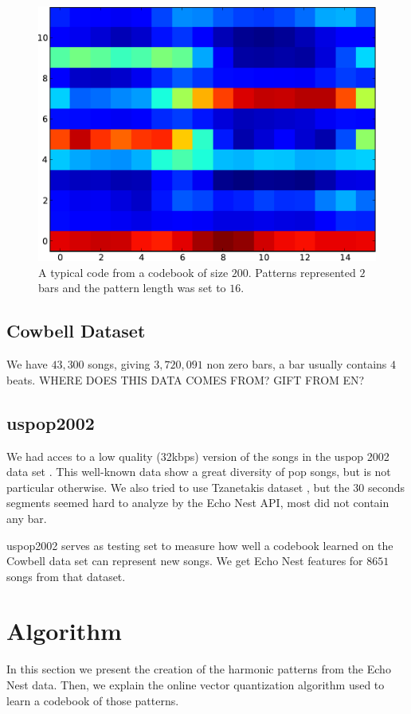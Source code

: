 \documentclass{article}
\begin{document}
\begin{figure}[htb]
\begin{center}
\includegraphics[width=.8\columnwidth]{code}
\end{center}
\caption{{A typical code from a codebook of size $200$. Patterns represented
$2$ bars and the pattern length was set to $16$.}}
\label{fig:code}
\end{figure}

\subsection{Cowbell Dataset}
We have $43,300$ songs, giving  $3,720,091$ non zero bars, a bar usually 
contains $4$ beats. WHERE DOES THIS DATA COMES FROM? GIFT FROM EN?


\subsection{uspop2002}
We had acces to a low quality (32kbps) version of the songs in the uspop 2002 
data set \cite{uspop2002}.
This well-known data show a great diversity of pop songs, but is not particular
otherwise. We also tried to use Tzanetakis dataset \cite{Tzanetakis2002a}, but 
the $30$ seconds segments seemed hard to analyze by the Echo Nest API, most did
not contain any bar.

uspop2002 serves as testing set to measure how well a codebook learned on
the Cowbell data set can represent new songs. We get Echo Nest features
for $8651$ songs from that dataset.

\section{Algorithm}\label{sec:algo}
In this section we present the creation of the harmonic patterns from
the Echo Nest data. Then, we explain the online vector quantization algorithm
used to learn a codebook of those patterns.
\end{document}
